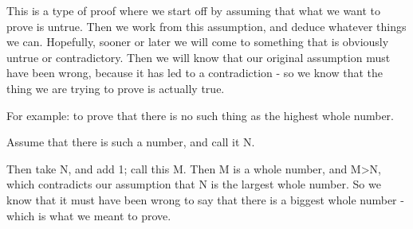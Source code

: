 This is a type of proof where we start off by assuming
that what we want to prove is untrue. Then we work from
this assumption, and deduce whatever things we can. Hopefully,
sooner or later we will come to something that is obviously
untrue or contradictory. Then we will know that our
original assumption must have been wrong, because it has
led to a contradiction - so we know that the thing we are
trying to prove is actually true.
\par
For example: to prove that there is no such thing as the
highest whole number.
\par
Assume that there is such a number, and call it N.
\par
Then take N, and add 1; call this M. Then M is a whole
number, and M>N, which contradicts our assumption that
N is the largest whole number. So we know that it
must have been wrong to say that there is a biggest whole
number - which is what we meant to prove.